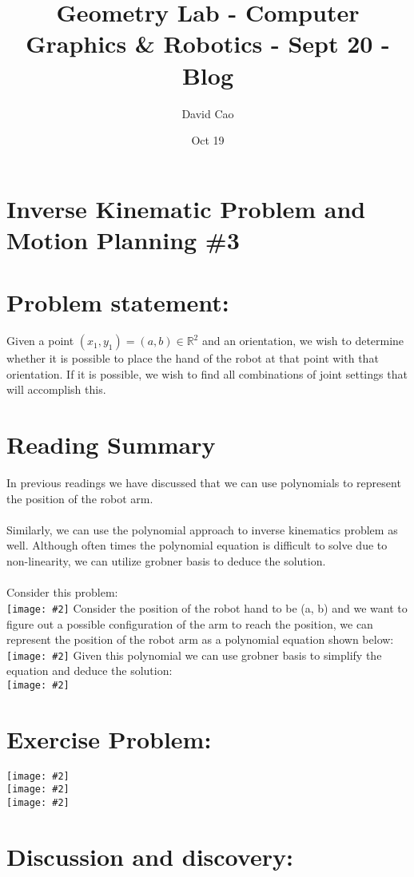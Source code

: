 \documentclass[11pt]{article}
\title{Geometry Lab - Computer Graphics \& Robotics - Sept 20 - Blog}
\author{David Cao}
\date{Oct 19}
\newcommand{\image}[2]{\texttt{[image: \#2]}}
\begin{document}
\maketitle

\section*{Inverse Kinematic Problem and Motion Planning \#3}
\section{Problem statement:}
Given a point $(x_1, y_1) = (a, b) \in \mathbb{R}^2$ and an orientation, we wish to determine whether it is possible to place the hand of the robot at that point with that orientation. If it is possible, we wish to find all combinations of joint settings that will accomplish this.

\section{Reading Summary}
In previous readings we have discussed that we can use polynomials to represent the position of the robot arm. \\
\\
Similarly, we can use the polynomial approach to inverse kinematics problem as well. Although often times the 
polynomial equation is difficult to solve due to non-linearity, we can utilize grobner basis to deduce the solution. \\
\\
Consider this problem: \\
\image{0.7}{img1}
Consider the position of the robot hand to be (a, b) and we want to figure out a possible configuration of the arm to reach the position, we can represent the position of the robot arm as a polynomial equation shown below: \\
\image{0.75}{img2}
Given this polynomial we can use grobner basis to simplify the equation and deduce the solution: \\
\image{0.6}{img3}

\section{Exercise Problem:}
\image{0.55}{img4} \\
\image{0.55}{img5} \\
\image{0.55}{img6}

\section{Discussion and discovery:}
\end{document}
